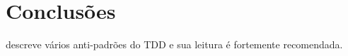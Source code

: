 \chapter{Conclusões} %
\label{cha:conclusoes}



 descreve vários anti-padrões do TDD e sua leitura é fortemente recomendada.

